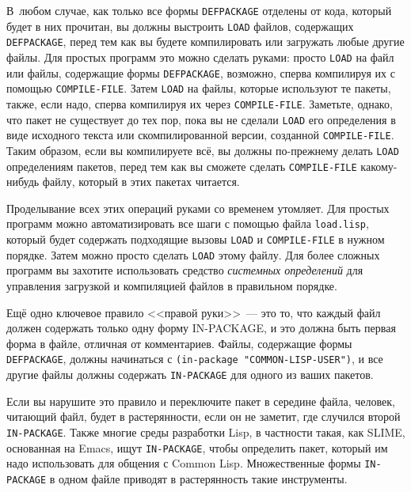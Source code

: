В~любом случае, как только все формы \lstinline{DEFPACKAGE} отделены от кода, который будет в
них прочитан, вы должны выстроить \lstinline{LOAD} файлов, содержащих \lstinline{DEFPACKAGE}, перед
тем как вы будете компилировать или загружать любые другие файлы. Для простых программ
это можно сделать руками: просто \lstinline{LOAD} на файл или файлы, содержащие формы
\lstinline{DEFPACKAGE}, возможно, сперва компилируя их с помощью \lstinline{COMPILE-FILE}. Затем
\lstinline{LOAD} на файлы, которые используют те пакеты, также, если надо, сперва компилируя их
через \lstinline{COMPILE-FILE}. Заметьте, однако, что пакет не существует до тех пор, пока вы
не сделали \lstinline{LOAD} его определения в виде исходного текста или скомпилированной
версии, созданной \lstinline{COMPILE-FILE}. Таким образом, если вы компилируете всё, вы должны
по-прежнему делать \lstinline{LOAD} определениям пакетов, перед тем как вы сможете сделать
\lstinline{COMPILE-FILE} какому-нибудь файлу, который в этих пакетах читается.

Проделывание всех этих операций руками со временем утомляет.  Для простых программ можно
автоматизировать все шаги с помощью файла \lstinline{load.lisp}, который будет содержать
подходящие вызовы \lstinline{LOAD} и \lstinline{COMPILE-FILE} в нужном порядке. Затем можно прос\-то
сделать \lstinline{LOAD} этому файлу. Для более сложных программ вы захотите использовать
средство \textit{системных определений} для управления загрузкой и компиляцией файлов в
правильном порядке.

Ещё одно ключевое правило <<правой руки>>~--- это то, что каждый файл должен содержать только
одну форму IN-PACKAGE, и это должна быть первая форма в файле, отличная от комментариев.
Файлы, содержащие формы \lstinline{DEFPACKAGE}, должны начинаться с 
\lstinline{(in-package "COMMON-LISP-USER")}, и все другие файлы должны содержать \lstinline{IN-PACKAGE} для одного из
ваших пакетов.

Если вы нарушите это правило и переключите пакет в середине файла, человек, читающий файл,
будет в растерянности, если он не заметит, где случился второй \lstinline{IN-PACKAGE}. Также
многие среды разработки Lisp, в частности такая, как SLIME, основанная на Emacs, ищут
\lstinline{IN-PACKAGE}, чтобы определить пакет, который им надо использовать для общения с
Common Lisp. Множественные формы \lstinline{IN-PACKAGE} в одном файле приводят в растерянность
такие инструменты.

